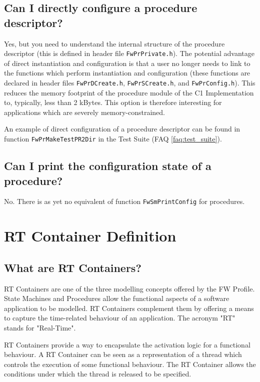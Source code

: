 \documentclass[faq]{../fwprofile}
\begin{document}
\subsection{Can I directly configure a procedure descriptor?}
Yes, but you need to understand the internal structure of the procedure descriptor (this is defined in header file \texttt{FwPrPrivate.h}). 
The potential advantage of direct instantiation and configuration is that a user no longer needs to link to the functions which perform instantiation 
and configuration (these functions are declared in header files \texttt{FwPrDCreate.h}, \texttt{FwPrSCreate.h}, and \texttt{FwPrConfig.h}). This reduces 
the memory footprint of the procedure module of the C1 Implementation to, typically, less than 2 kBytes. This option is therefore interesting for 
applications which are severely memory-constrained.

An example of direct configuration of a procedure descriptor can be found in function \texttt{FwPrMakeTestPR2Dir} in the Test Suite (FAQ \ref{faq:test_suite}).

\subsection{Can I print the configuration state of a procedure?}
No. There is as yet no equivalent of function \texttt{FwSmPrintConfig} for procedures.


\section{RT Container Definition}

\subsection{What are RT Containers?}
RT Containers are one of the three modelling concepts offered by the FW Profile. State Machines and Procedures allow the functional aspects of a software application to be
modelled. RT Containers complement them by offering a means to capture the
time-related behaviour of an application. The acronym "RT" stands for "Real-Time".

RT Containers provide a way to encapsulate the activation logic for a functional behaviour. A RT Container can be seen as a representation of a thread which controls the execution of some functional behaviour. The RT Container allows the conditions under which the thread is released to be specified.
\end{document}
